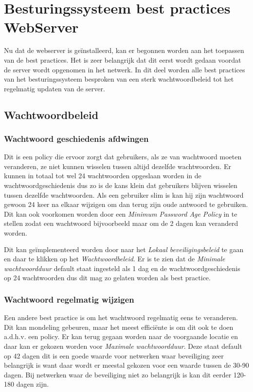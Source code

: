 \documentclass[pdftex,a4paper,12pt]{report}
\begin{document}
\section{Besturingssysteem best practices WebServer}
Nu dat de webserver is geïnstalleerd, kan er begonnen worden aan het toepassen van de best practices. Het is zeer belangrijk dat dit eerst wordt gedaan voordat de server wordt opgenomen in het netwerk. In dit deel worden alle best practices van het besturingssysteem besproken van een sterk wachtwoordbeleid tot het regelmatig updaten van de server.
\subsection{Wachtwoordbeleid}
\subsubsection{Wachtwoord geschiedenis afdwingen}
Dit is een policy die ervoor zorgt dat gebruikers, als ze van wachtwoord moeten veranderen, ze niet kunnen wisselen tussen altijd dezelfde wachtwoorden. Er kunnen in totaal tot wel 24 wachtwoorden opgeslaan worden in de wachtwoordgeschiedenis dus zo is de kans klein dat gebruikers blijven wisselen tussen dezelfde wachtwoorden. Als een gebruiker slim is kan hij zijn wachtwoord gewoon 24 keer na elkaar wijzigen om dan terug zijn oude antwoord te gebruiken. Dit kan ook voorkomen worden door een \textit{Minimum Password Age Policy} in te stellen zodat een wachtwoord bijvoorbeeld maar om de 2 dagen kan veranderd worden. \citep{Stanek2009} \newline

Dit kan geïmplementeerd worden door naar het \textit{Lokaal beveiligingsbeleid} te gaan en daar te klikken op het \textit{Wachtwoordbeleid}. Er is te zien dat de \textit{Minimale wachtwoordduur} default staat ingesteld als 1 dag en de wachtwoordgeschiedenis op 24 wachtwoorden dus dit mag zo gelaten worden als best practice.

\subsubsection{Wachtwoord regelmatig wijzigen}
Een andere best practice is om het wachtwoord regelmatig eens te veranderen. Dit kan mondeling gebeuren, maar het meest efficiënte is om dit ook te doen a.d.h.v. een policy. Er kan terug gegaan worden naar de voorgaande locatie en daar kan er gekozen worden voor \textit{Maximale wachtwoordduur}. Deze staat default op 42 dagen dit is een goede waarde voor netwerken waar beveiliging zeer belangrijk is want daar wordt er meestal gekozen voor een waarde tussen de 30-90 dagen. Bij netwerken waar de beveiliging niet zo belangrijk is kan dit eerder 120-180 dagen zijn. \citep{Stanek2009}
\end{document}

